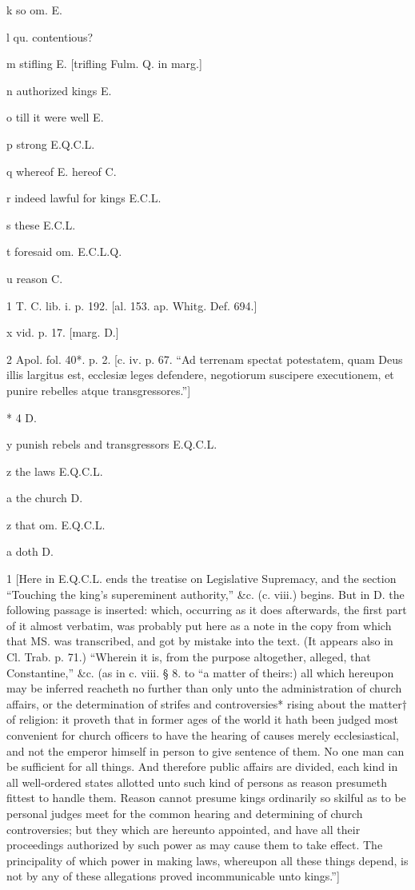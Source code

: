 k
so om. E.

l
qu. contentious?

m
stifling E. [trifling Fulm. Q. in marg.]

n
authorized kings E.

o
till it were well E.

p
strong E.Q.C.L.

q
whereof E. hereof C.

r
indeed lawful for kings E.C.L.

s
these E.C.L.

t
foresaid om. E.C.L.Q.

u
reason C.

1
T. C. lib. i. p. 192. [al. 153. ap. Whitg. Def. 694.]

x
vid. p. 17. [marg. D.]

2
Apol. fol. 40*. p. 2. [c. iv. p. 67. “Ad terrenam spectat potestatem, quam Deus illis largitus est, ecclesiæ leges defendere, negotiorum suscipere executionem, et punire rebelles atque transgressores.”]

*
4 D.

y
punish rebels and transgressors E.Q.C.L.

z
the laws E.Q.C.L.

a
the church D.

z
that om. E.Q.C.L.

a
doth D.

1
[Here in E.Q.C.L. ends the treatise on Legislative Supremacy, and the section “Touching the king’s supereminent authority,” &c. (c. viii.) begins. But in D. the following passage is inserted: which, occurring as it does afterwards, the first part of it almost verbatim, was probably put here as a note in the copy from which that MS. was transcribed, and got by mistake into the text. (It appears also in Cl. Trab. p. 71.) “Wherein it is, from the purpose altogether, alleged, that Constantine,” &c. (as in c. viii. § 8. to “a matter of theirs:) all which hereupon may be inferred reacheth no further than only unto the administration of church affairs, or the determination of strifes and controversies* rising about the matter† of religion: it proveth that in former ages of the world it hath been judged most convenient for church officers to have the hearing of causes merely ecclesiastical, and not the emperor himself in person to give sentence of them. No one man can be sufficient for all things. And therefore public affairs are divided, each kind in all well-ordered states allotted unto such kind of persons as reason presumeth fittest to handle them. Reason cannot presume kings ordinarily so skilful as to be personal judges meet for the common hearing and determining of church controversies; but they which are hereunto appointed, and have all their proceedings authorized by such power as may cause them to take effect. The principality of which power in making laws, whereupon all these things depend, is not by any of these allegations proved incommunicable unto kings.”]

